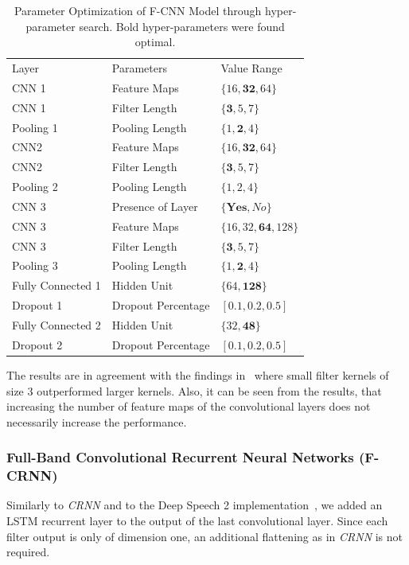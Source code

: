 \begin{table}
  \caption{Parameter Optimization of F-CNN Model through hyper-parameter search. Bold hyper-parameters were found optimal.}%
  \label{tab:fcnnhyper}
  \centering
\begin{tabular}{lll}
  \toprule
  Layer               & Parameters        & Value Range \\
  CNN 1               & Feature Maps      & \( \{16, \mathbf{32}, 64\} \) \\
  CNN 1               & Filter Length     & \( \{\mathbf{3}, 5, 7\} \) \\
  Pooling 1           & Pooling Length    & \( \{1, \mathbf{2}, 4\} \) \\
  CNN2                & Feature Maps      & \( \{16, \mathbf{32}, 64\} \) \\
  CNN2                & Filter Length     & \( \{\mathbf{3}, 5, 7\} \) \\
  Pooling 2           & Pooling Length    & \( \{1, 2, 4\} \) \\
  \midrule
  CNN 3               & Presence of Layer & \( \{\mathbf{Yes}, No\} \) \\
  CNN 3               & Feature Maps      & \( \{16, 32, \mathbf{64}, 128\} \) \\
  CNN 3               & Filter Length     & \( \{\mathbf{3}, 5, 7\} \) \\
  Pooling 3           & Pooling Length    & \( \{1, \mathbf{2}, 4\} \) \\
  \midrule
  Fully Connected 1   & Hidden Unit       & \( \{64, \mathbf{128}\} \) \\
  Dropout 1           & Dropout Percentage& \( [0.1, \mathbf{0.2}, 0.5] \) \\
  Fully Connected 2   & Hidden Unit       & \( \{32, \mathbf{48}\} \) \\
  Dropout 2           & Dropout Percentage& \( [0.1, \mathbf{0.2}, 0.5] \) \\
  \bottomrule
  \end{tabular}
\end{table}

The results are in agreement with the findings in~\cite{schluter16} where small filter kernels of size 3 outperformed larger kernels. Also, it can be seen from the results, that increasing the number of feature maps of the convolutional layers does not necessarily increase the performance.

\subsubsection{Full-Band Convolutional Recurrent Neural Networks (F-CRNN)}%
Similarly to \emph{CRNN} and to the Deep Speech 2 implementation~\cite{amodei16}, we added an LSTM recurrent layer to the output of the last convolutional layer.
Since each filter output is only of dimension one, an additional flattening as in \emph{CRNN} is not required.

